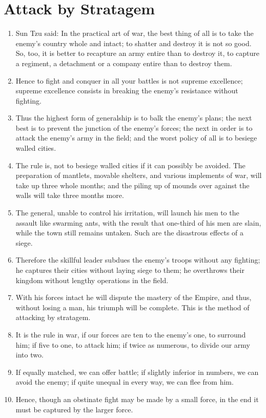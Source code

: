 \documentclass[oneside]{book}
\begin{document}
\chapter{Attack by Stratagem}
\begin{enumerate}
	\item Sun Tzu said: In the practical art of war, the best thing of all is to take the enemy's country whole and intact; to shatter and destroy it is not so good. So, too, it is better to recapture an army entire than to destroy it, to capture a regiment, a detachment or a company entire than to destroy them.
	\item Hence to fight and conquer in all your battles is not supreme excellence; supreme excellence consists in breaking the enemy's resistance without fighting.
	\item Thus the highest form of generalship is to balk the enemy's plans; the next best is to prevent the junction of the enemy's forces; the next in order is to attack the enemy's army in the field; and the worst policy of all is to besiege walled cities.
	\item The rule is, not to besiege walled cities if it can possibly be avoided. The preparation of mantlets, movable shelters, and various implements of war, will take up three whole months; and the piling up of mounds over against the walls will take three months more.
	\item The general, unable to control his irritation, will launch his men to the assault like swarming ants, with the result that one-third of his men are slain, while the town still remains untaken. Such are the disastrous effects of a siege.
	\item Therefore the skillful leader subdues the enemy's troops without any fighting; he captures their cities without laying siege to them; he overthrows their kingdom without lengthy operations in the field.
	\item With his forces intact he will dispute the mastery of the Empire, and thus, without losing a man, his triumph will be complete. This is the method of attacking by stratagem.
	\item It is the rule in war, if our forces are ten to the enemy's one, to surround him; if five to one, to attack him; if twice as numerous, to divide our army into two.
	\item If equally matched, we can offer battle; if slightly inferior in numbers, we can avoid the enemy; if quite unequal in every way, we can flee from him.
	\item Hence, though an obstinate fight may be made by a small force, in the end it must be captured by the larger force.

\end{enumerate}
\end{document}

